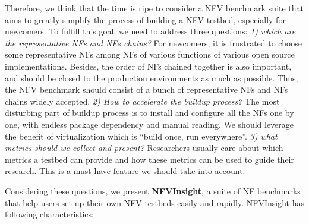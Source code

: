 Therefore, we think that the time is ripe to consider a NFV benchmark suite that aims to greatly simplify the process of building a NFV testbed, especially for newcomers. To fulfill this goal, we need to address three questions:
\textit{1) which are the representative NFs and NFs chains?} For newcomers, it is frustrated to choose some representative NFs among NFs of various functions of various open source implementations. Besides, the order of NFs chained together is also important, and should be closed to the production environments as much as possible. Thus, the NFV benchmark should consist of a bunch of representative NFs and NFs chains widely accepted.
\textit{2) How to accelerate the buildup process?} The most disturbing part of buildup process is to install and configure all the NFs one by one, with endless package dependency and manual reading. We should leverage the benefit of virtualization which is ``build once, run everywhere''.
\textit{3) what metrics should we collect and present?} Researchers usually care about which metrics a testbed
can provide and how these metrics can be used to guide their research. This is a must-have feature we should take into account. 

Considering these questions, we present \textbf{NFVInsight}, a suite of NF benchmarks that help users set up their own NFV testbeds easily and rapidly. NFVInsight has following characteristics:






